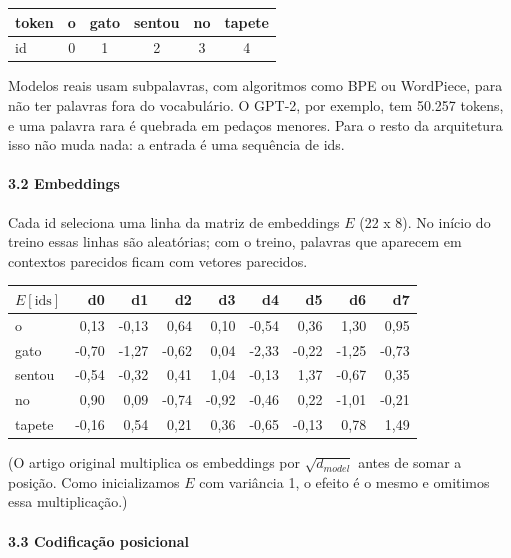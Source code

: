 \documentclass[12pt, a4paper]{article}
\begin{document}
\begin{longtable}{@{}lccccc@{}}
\toprule\noalign{}
token & o & gato & sentou & no & tapete \\
\midrule\noalign{}
\endhead
\bottomrule\noalign{}
\endlastfoot
id & 0 & 1 & 2 & 3 & 4 \\
\end{longtable}

Modelos reais usam subpalavras, com algoritmos como BPE ou WordPiece, para não ter palavras fora do vocabulário. O GPT-2, por exemplo, tem 50.257 tokens, e uma palavra rara é quebrada em pedaços menores. Para o resto da arquitetura isso não muda nada: a entrada é uma sequência de ids.

\paragraph{3.2 Embeddings}\label{32-embeddings}

Cada id seleciona uma linha da matriz de embeddings \(E\) (22 x 8). No início do treino essas linhas são aleatórias; com o treino, palavras que aparecem em contextos parecidos ficam com vetores parecidos.

\begin{longtable}{@{}lrrrrrrrr@{}}
\toprule\noalign{}
\(E[\text{ids}]\) & d0 & d1 & d2 & d3 & d4 & d5 & d6 & d7 \\
\midrule\noalign{}
\endhead
\bottomrule\noalign{}
\endlastfoot
o & 0,13 & -0,13 & 0,64 & 0,10 & -0,54 & 0,36 & 1,30 & 0,95 \\
gato & -0,70 & -1,27 & -0,62 & 0,04 & -2,33 & -0,22 & -1,25 & -0,73 \\
sentou & -0,54 & -0,32 & 0,41 & 1,04 & -0,13 & 1,37 & -0,67 & 0,35 \\
no & 0,90 & 0,09 & -0,74 & -0,92 & -0,46 & 0,22 & -1,01 & -0,21 \\
tapete & -0,16 & 0,54 & 0,21 & 0,36 & -0,65 & -0,13 & 0,78 & 1,49 \\
\end{longtable}

(O artigo original multiplica os embeddings por \(\sqrt{d_{model}}\) antes de somar a posição. Como inicializamos \(E\) com variância 1, o efeito é o mesmo e omitimos essa multiplicação.)

\paragraph{3.3 Codificação posicional}\label{33-codificauxe7uxe3o-posicional}
\end{document}
